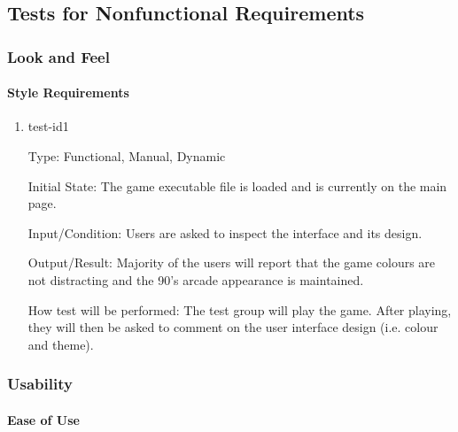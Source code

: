 \documentclass[12pt, titlepage]{article}
\begin{document}
\subsection{Tests for Nonfunctional Requirements}

\subsubsection{Look and Feel}

\paragraph{Style Requirements}

\begin{enumerate}


\item{test-id1\\}

Type: Functional, Manual, Dynamic 
					
Initial State: The game executable file is loaded and is currently on the main page.
					
Input/Condition: Users are asked to inspect the interface and its design.
					
Output/Result: Majority of the users  will report that the game colours are not distracting and the 90's arcade appearance is maintained.
					
How test will be performed: The test group will play the game. After playing, they will then be asked to comment on the user interface design (i.e. colour and theme).

\end{enumerate}


\subsubsection{Usability}
		
\paragraph{Ease of Use}
\end{document}
